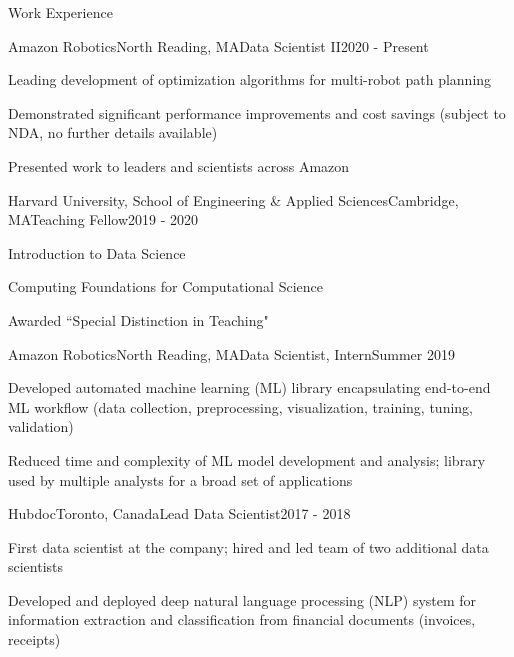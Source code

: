 \documentclass{resume} %
\begin{document}
\begin{rSection}{Work Experience}

\begin{rSubsection}{Amazon Robotics}{North Reading, MA}{Data Scientist II}{2020 - Present}
	\item Leading development of optimization algorithms for multi-robot path planning
	\item Demonstrated significant performance improvements and cost savings (subject to NDA, no further details available)
	\item Presented work to leaders and scientists across Amazon
\end{rSubsection}
\begin{rSubsection}{Harvard University, School of Engineering \& Applied Sciences}{Cambridge, MA}{Teaching Fellow}{2019 - 2020}
	\item Introduction to Data Science
	\item Computing Foundations for Computational Science
	\item Awarded ``Special Distinction in Teaching"
\end{rSubsection}
\begin{rSubsection}{Amazon Robotics}{North Reading, MA}{Data Scientist, Intern}{Summer 2019}
	\item Developed automated machine learning (ML) library encapsulating end-to-end ML workflow (data collection, preprocessing, visualization, training, tuning, validation)
	\item Reduced time and complexity of ML model development and analysis; library used by multiple analysts for a broad set of applications
\end{rSubsection}
\begin{rSubsection}{Hubdoc}{Toronto, Canada}{Lead Data Scientist}{2017 - 2018}
	\item First data scientist at the company; hired and led team of two additional data scientists
	\item Developed and deployed deep natural language processing (NLP) system for information extraction and classification from financial documents (invoices, receipts)

\end{rSubsection}
\end{rSection}
\end{document}
